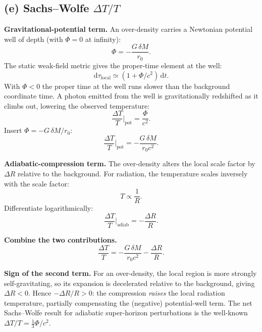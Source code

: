 \documentclass[11pt]{article}
\newcommand{\de}{\mathrm{d}}
\begin{document}
\subsection*{(e) Sachs--Wolfe $\Delta T/T$}

\textbf{Gravitational-potential term.} An over-density carries a Newtonian potential well of depth (with $\Phi=0$ at infinity):
\[ \Phi=-\frac{G\,\delta M}{r_0}. \]
The static weak-field metric gives the proper-time element at the well:
\[ \de\tau_{\text{local}}\simeq(1+\Phi/c^2)\,\de t. \]
With $\Phi<0$ the proper time at the well runs slower than the background coordinate time. A photon emitted from the well is gravitationally redshifted as it climbs out, lowering the observed temperature:
\[ \frac{\Delta T}{T}\bigg|_{\text{pot}}=\frac{\Phi}{c^2}. \]
Insert $\Phi=-G\,\delta M/r_0$:
\[ \frac{\Delta T}{T}\bigg|_{\text{pot}}=-\frac{G\,\delta M}{r_0 c^2}. \]

\textbf{Adiabatic-compression term.} The over-density alters the local scale factor by $\Delta R$ relative to the background. For radiation, the temperature scales inversely with the scale factor:
\[ T\propto \frac{1}{R}. \]
Differentiate logarithmically:
\[ \frac{\Delta T}{T}\bigg|_{\text{adiab}}=-\frac{\Delta R}{R}. \]

\textbf{Combine the two contributions.}
\begin{equation}
\boxed{\;\frac{\Delta T}{T}=-\frac{G\,\delta M}{r_0 c^2}-\frac{\Delta R}{R}.\;}
\label{eq:sachs-wolfe}
\end{equation}

\textbf{Sign of the second term.} For an over-density, the local region is more strongly self-gravitating, so its expansion is decelerated relative to the background, giving $\Delta R<0$. Hence $-\Delta R/R>0$: the compression \emph{raises} the local radiation temperature, partially compensating the (negative) potential-well term. The net Sachs--Wolfe result for adiabatic super-horizon perturbations is the well-known $\Delta T/T=\tfrac13\Phi/c^2$.
\end{document}
